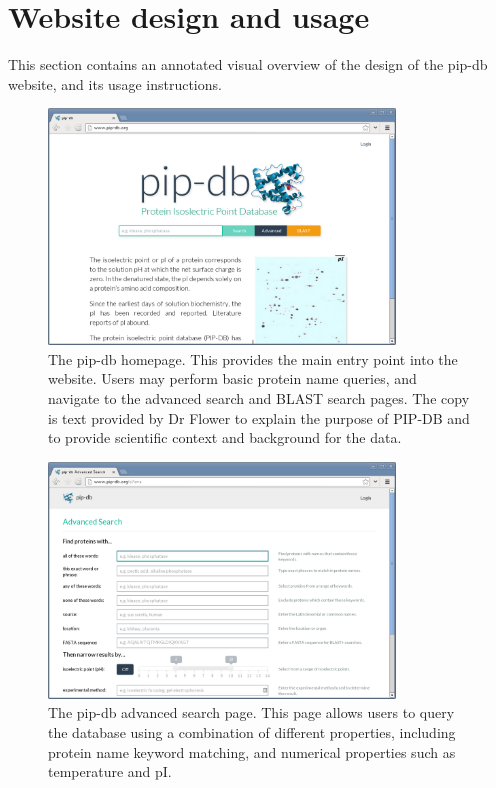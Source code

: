 \newpage
\section{Website design and usage}\label{sec:website-design}

This section contains an annotated visual overview of the design of
the pip-db website, and its usage instructions.

\vspace{1.5cm}


\begin{figure}[H]
\centering
    \includegraphics[width=0.82\textwidth]{assets/pip-db}
\caption[pip-db homepage]
        {The pip-db homepage. This provides the main entry point into
          the website. Users may perform basic protein name queries,
          and navigate to the advanced search and BLAST search
          pages. The copy is text provided by Dr Flower to explain the
          purpose of PIP-DB and to provide scientific context and
          background for the data.}
\label{fig:pip-db}
\end{figure}


\begin{figure}[H]
\centering
    \includegraphics[width=0.82\textwidth]{assets/pip-db-advanced}
\caption[pip-db advanced search page]
        {The pip-db advanced search page. This page allows users to
          query the database using a combination of different
          properties, including protein name keyword matching, and
          numerical properties such as temperature and pI.}
\label{fig:pip-db-advanced}
\end{figure}


